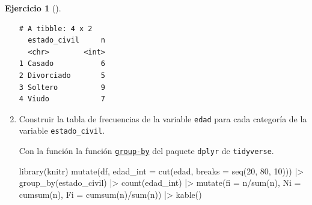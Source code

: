 \documentclass[
  spanish,
  a4paper,
]{scrreport}
\newenvironment{Shaded}{\begin{snugshade}}{\end{snugshade}}
\newcommand{\AttributeTok}[1]{\textcolor[rgb]{0.40,0.45,0.13}{#1}}
\newcommand{\DecValTok}[1]{\textcolor[rgb]{0.68,0.00,0.00}{#1}}
\newcommand{\FunctionTok}[1]{\textcolor[rgb]{0.28,0.35,0.67}{#1}}
\newcommand{\NormalTok}[1]{\textcolor[rgb]{0.00,0.23,0.31}{#1}}
\newcommand{\SpecialCharTok}[1]{\textcolor[rgb]{0.37,0.37,0.37}{#1}}
\theoremstyle{definition}
\newtheorem{exercise}{Ejercicio}[chapter]
\theoremstyle{remark}
\begin{document}
\begin{exercise}[]
\begin{enumerate}
\begin{tcolorbox}
\begin{verbatim}
# A tibble: 4 x 2
  estado_civil     n
  <chr>        <int>
1 Casado           6
2 Divorciado       5
3 Soltero          9
4 Viudo            7
\end{verbatim}

  \end{tcolorbox}
\item
  Construir la tabla de frecuencias de la variable \texttt{edad} para
  cada categoría de la variable \texttt{estado\_civil}.

  \begin{tcolorbox}[enhanced jigsaw, colback=white, opacityback=0, title=\textcolor{quarto-callout-tip-color}{\faLightbulb}\hspace{0.5em}{Solución}, toprule=.15mm, titlerule=0mm, breakable, toptitle=1mm, colframe=quarto-callout-tip-color-frame, coltitle=black, opacitybacktitle=0.6, bottomrule=.15mm, arc=.35mm, colbacktitle=quarto-callout-tip-color!10!white, leftrule=.75mm, bottomtitle=1mm, rightrule=.15mm, left=2mm]

  Con la función la función
  \href{https://aprendeconalf.es/manual-r/06-preprocesamiento.html\#res\%C3\%BAmenes-por-grupos}{\texttt{group-by}}
  del paquete \texttt{dplyr} de \texttt{tidyverse}.

\begin{Shaded}
\begin{Highlighting}[]
\FunctionTok{library}\NormalTok{(knitr)}
\FunctionTok{mutate}\NormalTok{(df, }\AttributeTok{edad\_int =} \FunctionTok{cut}\NormalTok{(edad, }\AttributeTok{breaks =} \FunctionTok{seq}\NormalTok{(}\DecValTok{20}\NormalTok{, }\DecValTok{80}\NormalTok{, }\DecValTok{10}\NormalTok{))) }\SpecialCharTok{|\textgreater{}}
    \FunctionTok{group\_by}\NormalTok{(estado\_civil) }\SpecialCharTok{|\textgreater{}}
    \FunctionTok{count}\NormalTok{(edad\_int) }\SpecialCharTok{|\textgreater{}} 
    \FunctionTok{mutate}\NormalTok{(}\AttributeTok{fi =}\NormalTok{ n}\SpecialCharTok{/}\FunctionTok{sum}\NormalTok{(n), }\AttributeTok{Ni =} \FunctionTok{cumsum}\NormalTok{(n), }\AttributeTok{Fi =} \FunctionTok{cumsum}\NormalTok{(n)}\SpecialCharTok{/}\FunctionTok{sum}\NormalTok{(n)) }\SpecialCharTok{|\textgreater{}}
    \FunctionTok{kable}\NormalTok{()}
\end{Highlighting}
\end{Shaded}


\end{tcolorbox}
\end{enumerate}
\end{exercise}
\end{document}
